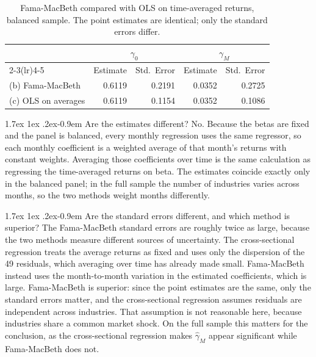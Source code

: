 \documentclass[11pt]{article}
\makeatletter
\renewcommand\paragraph{\@startsection{paragraph}{4}{0pt}%
  {1.7ex \@plus 1ex \@minus .2ex}{-0.9em}%
  {\normalfont\bfseries\normalsize\color{psink}}}
\makeatother
\begin{document}
\begin{table}[H]
\centering
\caption{Fama-MacBeth compared with OLS on time-averaged returns, balanced
sample. The point estimates are identical; only the standard errors differ.}
\small
\begin{tabular}{lrrrr}
\toprule
& \multicolumn{2}{c}{$\gamma_0$} & \multicolumn{2}{c}{$\gamma_M$} \\
\cmidrule(lr){2-3}\cmidrule(lr){4-5}
& Estimate & Std.\ Error & Estimate & Std.\ Error \\
\midrule
(b) Fama-MacBeth & 0.6119 & 0.2191 & 0.0352 & 0.2725 \\
(c) OLS on averages & 0.6119 & 0.1154 & 0.0352 & 0.1086 \\
\bottomrule
\end{tabular}
\label{tab:cs}
\end{table}

\paragraph{Are the estimates different?} No. Because the betas are fixed and
the panel is balanced, every monthly regression uses the same regressor, so
each monthly coefficient is a weighted average of that month's returns with
constant weights. Averaging those coefficients over time is the same
calculation as regressing the time-averaged returns on beta. The estimates
coincide exactly only in the balanced panel; in the full sample the number of
industries varies across months, so the two methods weight months differently.

\paragraph{Are the standard errors different, and which method is superior?}
The Fama-MacBeth standard errors are roughly twice as large, because the two
methods measure different sources of uncertainty. The cross-sectional
regression treats the average returns as fixed and uses only the dispersion of
the 49 residuals, which averaging over time has already made small.
Fama-MacBeth instead uses the month-to-month variation in the estimated
coefficients, which is large. Fama-MacBeth is superior: since the point
estimates are the same, only the standard errors matter, and the
cross-sectional regression assumes residuals are independent across industries.
That assumption is not reasonable here, because industries share a common
market shock. On the full sample this matters for the conclusion, as the
cross-sectional regression makes $\hat\gamma_M$ appear significant while
Fama-MacBeth does not.
\end{document}
